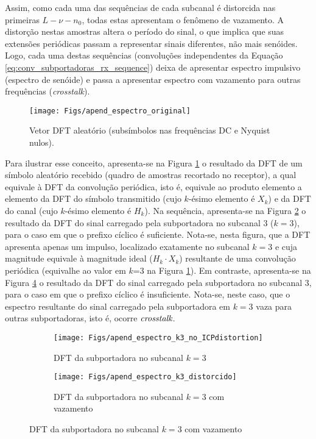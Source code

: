 Assim, como cada uma das sequências de cada subcanal é distorcida nas primeiras $L - \nu - n_0$, todas estas apresentam o fenômeno de vazamento. A distorção nestas amostras altera o período do sinal, o que implica que suas extensões periódicas passam a representar sinais diferentes, não mais senóides. Logo, cada uma destas sequências (convoluções independentes da Equação \ref{eq:conv_subportadoras_rx_sequence}) deixa de apresentar espectro impulsivo (espectro de senóide) e passa a apresentar espectro com vazamento para outras frequências (\emph{crosstalk}). 

\begin{figure}[htbp]
\centering
\texttt{[image: Figs/apend\_espectro\_original]}
\caption{ Vetor DFT aleatório (subsímbolos nas frequências DC e Nyquist nulos).  \label{fig:apend_espectro_original}}
\end{figure}

Para ilustrar esse conceito, apresenta-se na Figura \ref{fig:apend_espectro_original} o resultado da DFT de um símbolo aleatório recebido (quadro de amostras recortado no receptor), a qual equivale à DFT da convolução periódica, isto é, equivale ao produto elemento a elemento da DFT do símbolo transmitido (cujo $k$-ésimo elemento é $X_k$) e da DFT do canal (cujo $k$-ésimo elemento é $H_k$). Na sequência, apresenta-se na Figura \ref{fig:apend_espectro_k3_naoDistorcido} o resultado da DFT do sinal carregado pela subportadora no subcanal $3$ ($k =3$), para o caso em que o prefixo cíclico é suficiente. Nota-se, nesta figura, que a DFT apresenta apenas um impulso, localizado exatamente no subcanal $k=3$ e cuja magnitude equivale à magnitude ideal ($H_k \cdot X_k$) resultante de uma convolução periódica (equivalhe ao valor em $k$=3 na Figura \ref{fig:apend_espectro_original}). Em contraste, apresenta-se na Figura \ref{fig:apend_espectro_k3_distorcido} o resultado da DFT do sinal carregado pela subportadora no subcanal $3$, para o caso em que o prefixo cíclico é insuficiente. Nota-se, neste caso, que o espectro resultante do sinal carregado pela subportadora em $k=3$ vaza para outras subportadoras, isto é, ocorre $\emph{crosstalk}$.

\begin{figure}[htbp]
\centering
	\begin{subfigure}[b]{0.75\textwidth}
		\centering
		\texttt{[image: Figs/apend\_espectro\_k3\_no\_ICPdistortion]}
		\caption{ DFT da subportadora no subcanal $k=3$  										\label{fig:apend_espectro_k3_naoDistorcido}}
	\end{subfigure}
	\begin{subfigure}[b]{0.75\textwidth}
		\centering
		\texttt{[image: Figs/apend\_espectro\_k3\_distorcido]}
		\caption{ DFT da subportadora no subcanal $k=3$ com vazamento  										\label{fig:apend_espectro_k3_distorcido}}
	\end{subfigure}
\end{figure}



